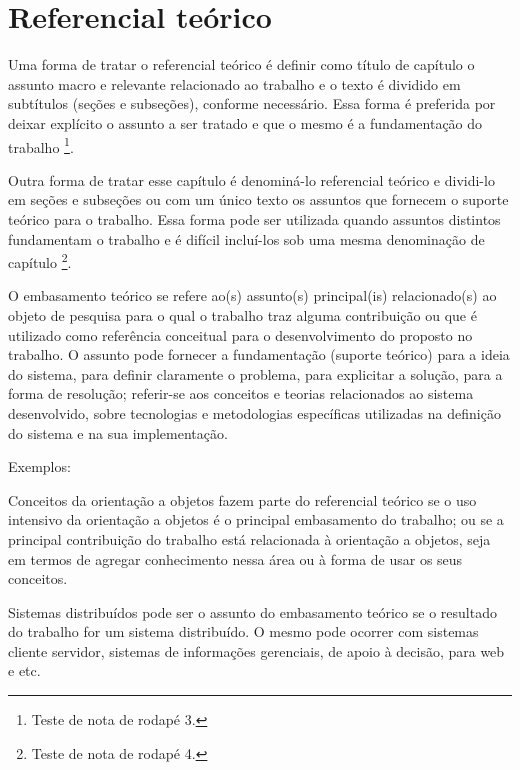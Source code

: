 \chapter{Referencial te\'orico}\label{cap:referencialTeorico}

Uma forma de tratar o referencial teórico é definir como título de capítulo o assunto macro e relevante relacionado ao trabalho e o texto é dividido em subtítulos (seções e subseções), conforme necessário. Essa forma é preferida por deixar explícito o assunto a ser tratado e que o mesmo é a fundamentação do trabalho \footnote{Teste de nota de rodapé 3.}.

Outra forma de tratar esse capítulo é denominá-lo referencial teórico e dividi-lo em seções e subseções ou com um único texto os assuntos que fornecem o suporte teórico para o trabalho. Essa forma pode ser utilizada quando assuntos distintos fundamentam o trabalho e é difícil incluí-los sob uma mesma denominação de capítulo \footnote{Teste de nota de rodapé 4.}.

O embasamento teórico se refere ao(s) assunto(s) principal(is) relacionado(s) ao objeto de pesquisa para o qual o trabalho traz alguma contribuição ou que é utilizado como referência conceitual para o desenvolvimento do proposto no trabalho. O assunto pode fornecer a fundamentação (suporte teórico) para a ideia do sistema, para definir claramente o problema, para explicitar a solução, para a forma de resolução; referir-se aos conceitos e teorias relacionados ao sistema desenvolvido, sobre tecnologias e metodologias específicas utilizadas na definição do sistema e na sua implementação.

Exemplos:

Conceitos da orientação a objetos fazem parte do referencial teórico se o uso intensivo da orientação a objetos é o principal embasamento do trabalho; ou se a principal contribuição do trabalho está relacionada à orientação a objetos, seja em termos de agregar conhecimento nessa área ou à forma de usar os seus conceitos.

Sistemas distribuídos pode ser o assunto do embasamento teórico se o resultado do trabalho for um sistema distribuído. O mesmo pode ocorrer com sistemas cliente servidor, sistemas de informações gerenciais, de apoio à decisão, para web e etc.

